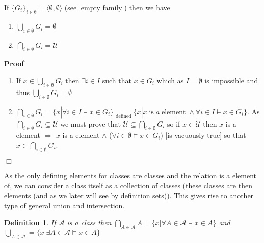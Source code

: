 \documentclass{book}
\newcommand{\equallim}{\mathop{=}\limits}
\newcommand{\nobracket}{}
\newcommand{\tmop}[1]{\ensuremath{\operatorname{#1}}}
\newenvironment{proof}{\noindent\textbf{Proof\ }}{\hspace*{\fill}$\Box$\medskip}
\newtheorem{definition}{Definition}
{\theorembodyfont{\rmfamily}\newtheorem{example}{Example}}
\begin{document}
{{\begin{example}
  \label{union and intersection of emptyset}If $\{ G_i \}_{i \in \emptyset} =
  \langle \emptyset, \emptyset \rangle$ (see \ref{empty family}) then we have
  \begin{enumerate}
    \item $\bigcup_{i \in \emptyset} G_i = \emptyset$
    
    \item $\bigcap_{i \in \emptyset} G_i =\mathcal{U}$
  \end{enumerate}
\end{example}

\begin{proof}
  
  \begin{enumerate}
    \item If $x \in \bigcup_{i \in \emptyset} G_i$ then $\exists i \in I$ such
    that $x \in G_i$ which as $I = \emptyset$ is impossible and thus
    $\bigcup_{i \in \emptyset} G_i = \emptyset$
    
    \item $\bigcap_{i \in \emptyset} G_i = \{ x| \forall i \in I \vDash x \in
    G_i \} \equallim_{\tmop{defined}} \{ x|x \tmop{is} a \tmop{element} \wedge
    \forall i \in I \vDash x \in G_i \}$. As $\bigcap_{i \in \emptyset} G_i
    \subseteq \mathcal{U}$ we must prove that $\mathcal{U} \subseteq
    \bigcap_{i \in \emptyset} G_i$ so if $x \in \mathcal{U}$ then $x$ is a
    element $\Rightarrow$ $x$ is a element $\wedge$ ($\forall i \in \emptyset
    \vDash x \in G_i$) [is vacuously true] so that $x \in \bigcap_{i \in
    \emptyset} G_i$.
  \end{enumerate}
\end{proof}



As the only defining elements for classes are classes and the relation is a
element of, we can consider a class itself as a collection of classes (these
classes are then elements (and as we later will see by definition sets)). This
gives rise to another type of general union and intersection.

\begin{definition}
  If $\mathcal{A}$ is a class then $\bigcap_{A \in \mathcal{A}} A = \{ x |
  \forall A \in \mathcal{A} \nobracket \vDash x \in A \}$ and $\bigcup_{A \in
  \mathcal{A}} = \{ x | \exists A \in \mathcal{A} \nobracket \vDash x \in A
  \}$
\end{definition}

}}
\end{document}
